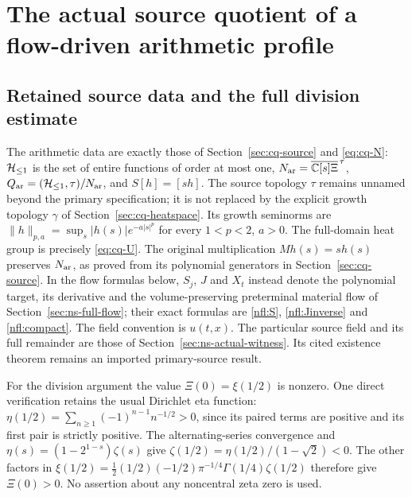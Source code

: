 \section{The actual source quotient of a flow-driven arithmetic profile}
\label{csq:sec-flow-source-quotient}


\subsection{Retained source data and the full division estimate}
The arithmetic data are exactly those of
Section~\ref{sec:cq-source} and \eqref{eq:cq-N}:
$\mathcal H_{\leq 1}$ is the set of entire functions of order at most one,
$N_{\rm ar}=\overline{\mathbb C[s]\Xi}^{\,\tau}$,
$Q_{\rm ar}=(\mathcal H_{\leq 1},\tau)/N_{\rm ar}$, and $S[h]=[sh]$.
The source topology $\tau$ remains unnamed beyond the primary
specification; it is not replaced by the explicit growth topology
$\gamma$ of Section~\ref{sec:cq-heatspace}.
Its growth seminorms are
$\|h\|_{p,a}=\sup_s|h(s)|e^{-a|s|^p}$ for every $1<p<2$, $a>0$.
The full-domain heat group is precisely \eqref{eq:cq-U}.
The original multiplication $M h(s)=s h(s)$ preserves $N_{\rm ar}$,
as proved from its polynomial generators in Section~\ref{sec:cq-source}.
In the flow formulas below, $S_j$, $J$ and $X_t$ instead denote
the polynomial target, its derivative and the volume-preserving
preterminal material flow of Section~\ref{sec:ns-full-flow};
their exact formulas are \eqref{nfl:S}, \eqref{nfl:Jinverse} and
\eqref{nfl:compact}. The field convention is $u(t,x)$.
The particular source field and its full remainder are those of
Section~\ref{sec:ns-actual-witness}. Its cited existence theorem
remains an imported primary-source result.

For the division argument the value $\Xi(0)=\xi(1/2)$ is nonzero.
One direct verification retains the usual Dirichlet eta function:
$\eta(1/2)=\sum_{n\geq1}(-1)^{n-1}n^{-1/2}>0$, since its paired
terms are positive and its first pair is strictly positive.
The alternating-series convergence and
$\eta(s)=(1-2^{1-s})\zeta(s)$ give
$\zeta(1/2)=\eta(1/2)/(1-\sqrt2)<0$.
The other factors in
$\xi(1/2)=\tfrac12(1/2)(-1/2)\pi^{-1/4}\Gamma(1/4)\zeta(1/2)$
therefore give $\Xi(0)>0$. No assertion about any noncentral
zeta zero is used.

